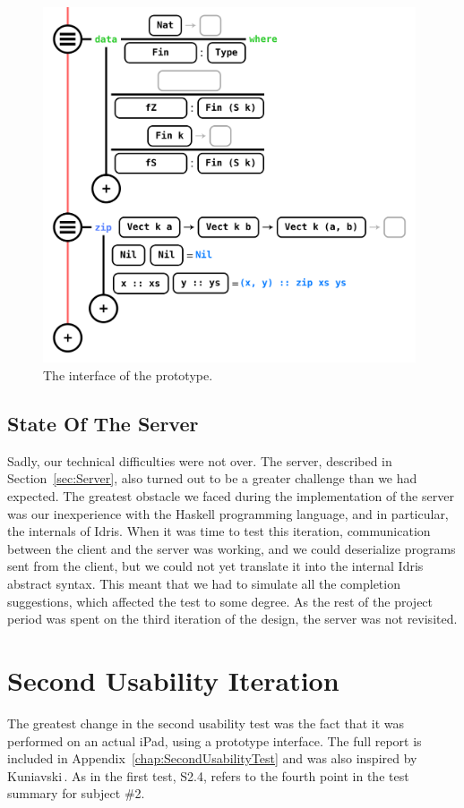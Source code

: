 \begin{figure}
	\centering
		\includegraphics[width=110mm]{diagrams/ipad_interface.PNG}
	\caption{The interface of the prototype.}
\label{fig:initialiPadInterface}
\end{figure}

\subsection{State Of The Server}
\label{subsec:state_of_the_server}
Sadly, our technical difficulties were not over. The server, described in Section~\ref{sec:Server}, also turned out to be a greater challenge than we had expected.
The greatest obstacle we faced during the implementation of the server was our inexperience with the Haskell programming language, and in particular, the internals of Idris.
When it was time to test this iteration, communication between the client and the server was working, and we could deserialize programs sent from the client, but we could not yet translate it into the internal Idris abstract syntax.
This meant that we had to simulate all the completion suggestions, which affected the test to some degree.
As the rest of the project period was spent on the third iteration of the design, the server was not revisited.

\section{Second Usability Iteration}
\label{sec:SecondUsabilityTest}
The greatest change in the second usability test was the fact that it was
performed on an actual iPad, using a prototype interface. The full report is
included in Appendix~\ref{chap:SecondUsabilityTest} and was also inspired by Kuniavski\,\cite{kuniavsky2003observing}. As in the first test, S2.4, refers to
the fourth point in the test summary for subject \#2.

